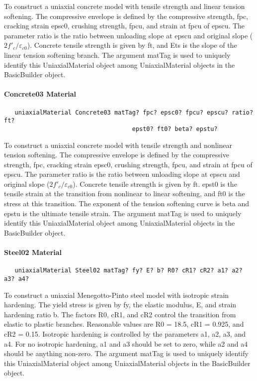 \documentclass[12pt]{article}
\begin{document}
To construct a uniaxial concrete model with tensile strength and linear tension
softening. The compressive envelope is defined by the compressive strength, fpc,
cracking strain epsc0, crushing strength, fpcu, and strain at fpcu of epscu. The
parameter ratio is the ratio between unloading slope at epscu and original slope
($2f'_c/\varepsilon_{c0}$). Concrete tensile strength is given by ft, and Ets
is the slope of the linear tension softening branch. The argument 
matTag is used to uniquely identify this UniaxialMaterial object among 
UniaxialMaterial objects in the BasicBuilder object.


\paragraph{Concrete03 Material}
{\sf\small
\begin{verbatim}
   uniaxialMaterial Concrete03 matTag? fpc? epsc0? fpcu? epscu? ratio? ft?
                                    epst0? ft0? beta? epstu?
\end{verbatim}
}

To construct a uniaxial concrete model with tensile strength and nonlinear tension
softening. The compressive envelope is defined by the compressive strength, fpc,
cracking strain epsc0, crushing strength, fpcu, and strain at fpcu of epscu. The
parameter ratio is the ratio between unloading slope at epscu and original slope
($2f'_c/\varepsilon_{c0}$). Concrete tensile strength is given by ft. epst0 is the
tensile strain at the transition from nonlinear to linear softening, and ft0 is the
stress at this transition. The exponent of the tension softening curve is beta and
epstu is the ultimate tensile strain. The argument 
matTag is used to uniquely identify this UniaxialMaterial object among 
UniaxialMaterial objects in the BasicBuilder object.


\paragraph{Steel02 Material}
{\sf\small
\begin{verbatim}
   uniaxialMaterial Steel02 matTag? fy? E? b? R0? cR1? cR2? a1? a2? a3? a4?
\end{verbatim}
}

To construct a uniaxial Menegotto-Pinto steel model with isotropic strain hardening.
The yield stress is given by fy, the elastic modulus, E, and strain hardening ratio b.
The factors R0, cR1, and cR2 control the transition from elastic to plastic branches.
Reasonable values are R0 = 18.5, cR1 = 0.925, and cR2 = 0.15. Isotropic hardening is
controlled by the parameters a1, a2, a3, and a4. For no isotropic hardening, a1 and
a3 should be set to zero, while a2 and a4 should be anything non-zero. The argument 
matTag is used to uniquely identify this UniaxialMaterial object among 
UniaxialMaterial objects in the BasicBuilder object.
\end{document}
